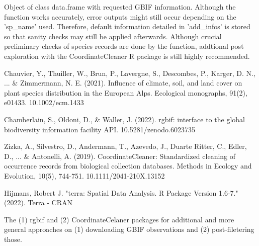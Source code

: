 \documentclass[a4paper]{book}
\begin{document}
%
\begin{Value}
Object of class data.frame with requested GBIF information. Although the function
works accurately, error outputs might still occur depending on the 'sp\_name' used.
Therefore, default information detailed in 'add\_infos' is stored so that sanity checks
may still be applied afterwards. Although crucial preliminary checks of species records
are done by the function, addtional post exploration with the CoordinateCleaner R
package is still highly recommended.
\end{Value}
%
\begin{References}\relax
Chauvier, Y., Thuiller, W., Brun, P., Lavergne, S., Descombes, P., Karger, D. N., ... \& Zimmermann,
N. E. (2021). Influence of climate, soil, and land cover on plant species distribution in the
European Alps. Ecological monographs, 91(2), e01433. 10.1002/ecm.1433

Chamberlain, S., Oldoni, D., \& Waller, J. (2022). rgbif: interface to the global biodiversity
information facility API. 10.5281/zenodo.6023735

Zizka, A., Silvestro, D., Andermann, T., Azevedo, J., Duarte Ritter, C., Edler, D., ... \& Antonelli,
A. (2019). CoordinateCleaner: Standardized cleaning of occurrence records from biological collection
databases. Methods in Ecology and Evolution, 10(5), 744-751. 10.1111/2041-210X.13152

Hijmans, Robert J. "terra: Spatial Data Analysis. R Package Version 1.6-7." (2022). Terra - CRAN
\end{References}
%
\begin{SeeAlso}\relax
The (1) rgbif and (2) CoordinateCelaner packages for additional and more general
approaches on (1) downloading GBIF observations and (2) post-filetering those.
\end{SeeAlso}
%
\end{document}
